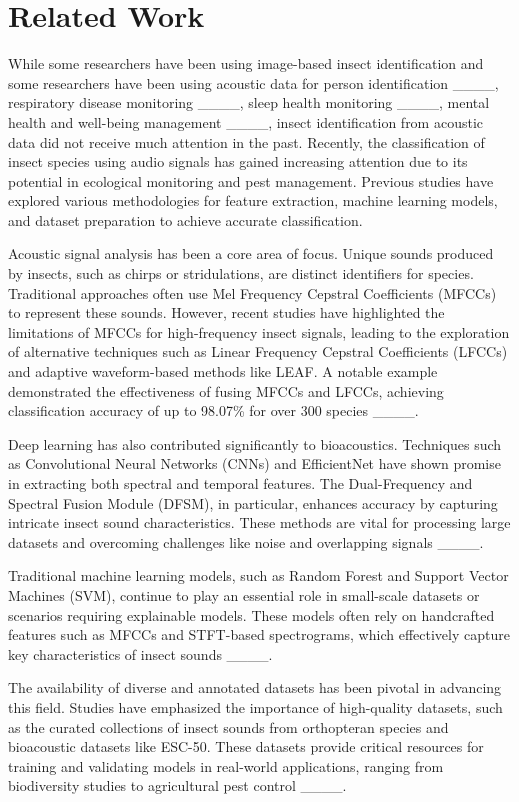 \section{Related Work}
While some researchers have been using image-based insect identification and some researchers have been using acoustic data for person identification ____, respiratory disease monitoring ____, sleep health monitoring ____, mental health and well-being management ____, insect identification from acoustic data did not receive much attention in the past. Recently, the classification of insect species using audio signals has gained increasing attention due to its potential in ecological monitoring and pest management. Previous studies have explored various methodologies for feature extraction, machine learning models, and dataset preparation to achieve accurate classification.

Acoustic signal analysis has been a core area of focus. Unique sounds produced by insects, such as chirps or stridulations, are distinct identifiers for species. Traditional approaches often use Mel Frequency Cepstral Coefficients (MFCCs) to represent these sounds. However, recent studies have highlighted the limitations of MFCCs for high-frequency insect signals, leading to the exploration of alternative techniques such as Linear Frequency Cepstral Coefficients (LFCCs) and adaptive waveform-based methods like LEAF. A notable example demonstrated the effectiveness of fusing MFCCs and LFCCs, achieving classification accuracy of up to 98.07\% for over 300 species ____.

Deep learning has also contributed significantly to bioacoustics. Techniques such as Convolutional Neural Networks (CNNs) and EfficientNet have shown promise in extracting both spectral and temporal features. The Dual-Frequency and Spectral Fusion Module (DFSM), in particular, enhances accuracy by capturing intricate insect sound characteristics. These methods are vital for processing large datasets and overcoming challenges like noise and overlapping signals ____.

Traditional machine learning models, such as Random Forest and Support Vector Machines (SVM), continue to play an essential role in small-scale datasets or scenarios requiring explainable models. These models often rely on handcrafted features such as MFCCs and STFT-based spectrograms, which effectively capture key characteristics of insect sounds ____.

The availability of diverse and annotated datasets has been pivotal in advancing this field. Studies have emphasized the importance of high-quality datasets, such as the curated collections of insect sounds from orthopteran species and bioacoustic datasets like ESC-50. These datasets provide critical resources for training and validating models in real-world applications, ranging from biodiversity studies to agricultural pest control ____.


